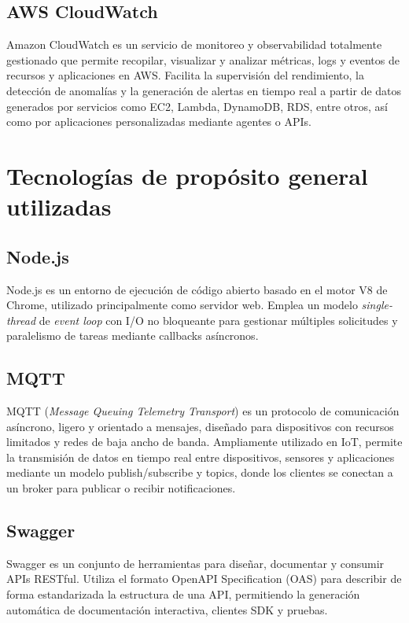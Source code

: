 \subsection{AWS CloudWatch}

Amazon CloudWatch \citep{aws_cloudwatch}  es un servicio de monitoreo y observabilidad totalmente gestionado que permite recopilar, visualizar y analizar métricas, logs y eventos de recursos y aplicaciones en AWS. Facilita la supervisión del rendimiento, la detección de anomalías y la generación de alertas en tiempo real a partir de datos generados por servicios como EC2, Lambda, DynamoDB, RDS, entre otros, así como por aplicaciones personalizadas mediante agentes o APIs. 


\section{Tecnologías de propósito general utilizadas}

\subsection{Node.js}

Node.js \citep{nodejs} es un entorno de ejecución de código abierto basado en el motor V8 de Chrome, utilizado principalmente como servidor web. Emplea un modelo \textit{single-thread} de \textit{event loop} con I/O no bloqueante para gestionar múltiples solicitudes y paralelismo de tareas mediante callbacks asíncronos.


\subsection{MQTT}

MQTT (\textit{Message Queuing Telemetry Transport}) \citep{mqtt_spec} es un protocolo de comunicación asíncrono, ligero y orientado a mensajes, diseñado para dispositivos con recursos limitados y redes de baja ancho de banda. Ampliamente utilizado en IoT, permite la transmisión de datos en tiempo real entre dispositivos, sensores y aplicaciones mediante un modelo publish/subscribe y topics, donde los clientes se conectan a un broker para publicar o recibir notificaciones.


\subsection{Swagger}
Swagger \citep{open_api} es un conjunto de herramientas para diseñar, documentar y consumir APIs RESTful. Utiliza el formato OpenAPI Specification (OAS) para describir de forma estandarizada la estructura de una API, permitiendo la generación automática de documentación interactiva, clientes SDK y pruebas.




